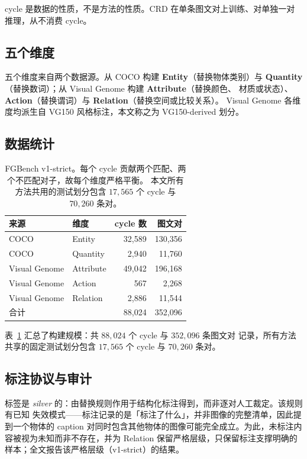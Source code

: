 \documentclass[10pt,twocolumn,a4paper]{ctexart}
\begin{document}
cycle 是数据的性质，不是方法的性质。CRD 在单条图文对上训练、对单独一对推理，从不消费
cycle。

\subsection{五个维度}
五个维度来自两个数据源。从 COCO 构建 \textbf{Entity}（替换物体类别）与
\textbf{Quantity}（替换数词）；从 Visual Genome 构建 \textbf{Attribute}（替换颜色、
材质或状态）、\textbf{Action}（替换谓词）与 \textbf{Relation}（替换空间或比较关系）。
Visual Genome 各维度均派生自 VG150 风格标注，本文称之为 VG150-derived 划分。

\subsection{数据统计}
\begin{table}[t]
\centering
\small
\setlength{\tabcolsep}{4pt}
\caption{FGBench v1-strict。每个 cycle 贡献两个匹配、两个不匹配对子，故每个维度严格平衡。
本文所有方法共用的测试划分包含 $17{,}565$ 个 cycle 与 $70{,}260$ 条对。}
\label{tab:fgbench-cn}
\begin{tabular}{llrr}
\toprule
来源 & 维度 & cycle 数 & 图文对 \\
\midrule
COCO & Entity & 32{,}589 & 130{,}356 \\
COCO & Quantity & 2{,}940 & 11{,}760 \\
Visual Genome & Attribute & 49{,}042 & 196{,}168 \\
Visual Genome & Action & 567 & 2{,}268 \\
Visual Genome & Relation & 2{,}886 & 11{,}544 \\
\midrule
\multicolumn{2}{l}{合计} & 88{,}024 & 352{,}096 \\
\bottomrule
\end{tabular}
\end{table}

表~\ref{tab:fgbench-cn} 汇总了构建规模：共 $88{,}024$ 个 cycle 与 $352{,}096$ 条图文对
记录，所有方法共享的固定测试划分包含 $17{,}565$ 个 cycle 与 $70{,}260$ 条对。

\subsection{标注协议与审计}
标签是 \emph{silver} 的：由替换规则作用于结构化标注得到，而非逐对人工裁定。该规则有已知
失效模式——标注记录的是「标注了什么」，并非图像的完整清单，因此提到一个物体的 caption
对同时包含其他物体的图像可能完全成立。为此，未标注内容被视为未知而非不存在，并为
Relation 保留严格层级，只保留标注支撑明确的样本；全文报告该严格层级（v1-strict）的结果。
\end{document}
